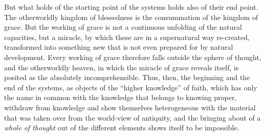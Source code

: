But what holds of the starting point of the systems holds also of their end point. The otherworldly kingdom of blessedness is the consummation of the kingdom of grace. But the working of grace is not a continuous unfolding of the natural capacities, but a miracle, by which these are in a supernatural way re-created, transformed into something new that is not even prepared for by natural development. Every working of grace therefore falls outside the sphere of thought, and the otherworldly heaven, in which the miracle of grace reveals itself, is posited as the absolutely incomprehensible. Thus, then, the beginning and the end of the systems, as objects of the ``higher knowledge'' of faith, which has only the name in common with the knowledge that belongs to knowing proper, withdraw from knowledge and show themselves heterogeneous with the material that was taken over from the world-view of antiquity, and the bringing about of a \emph{whole of thought} out of the different elements shows itself to be impossible.

